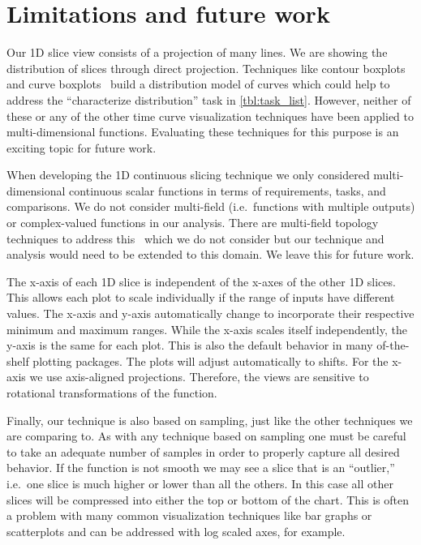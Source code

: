 \section{Limitations and future work}

Our 1D slice view consists of a projection of many lines. We are showing the
distribution of slices through direct projection. Techniques like contour
boxplots~\cite{Whitaker:2013} and curve boxplots~\cite{Mirzargar:2014} build a
distribution model of curves which could help to address the ``characterize
distribution'' task in \autoref{tbl:task_list}. However, neither of these or
any of the other time curve visualization techniques have been applied to
multi-dimensional functions. Evaluating these techniques for this purpose is an
exciting topic for future work.

When developing the 1D continuous slicing technique we only considered
multi-dimensional continuous scalar functions in terms of requirements, 
tasks, and comparisons. We do not consider multi-field 
(i.e.\ functions with multiple outputs) or complex-valued functions in our
analysis. There are multi-field topology techniques to address 
this~\cite{Duke:2012,Huettenberger:2014,Carr:2015} which we do not consider
but our technique and analysis would need to be extended to this domain.
We leave this for future work.

The x-axis of each 1D slice is independent of the x-axes of the other 1D
slices. This allows each plot to scale individually if the range of inputs have
different values.  The x-axis and y-axis automatically change to incorporate
their respective minimum and maximum ranges. While the x-axis scales itself
independently, the y-axis is the same for each plot.  This is also the default
behavior in many of-the-shelf plotting packages. The plots will adjust
automatically to shifts.  For the x-axis we use axis-aligned projections.
Therefore, the views are sensitive to rotational transformations of the
function. 

Finally, our technique is also based on sampling, just like the other
techniques we are comparing to. As with any technique based on sampling one
must be careful to take an adequate number of samples in order to properly
capture all desired behavior.
If the function is not smooth we may see a slice that is an ``outlier,'' i.e.\
one slice is much higher or lower than all the others. In this case all other
slices will be compressed into either the top or bottom of the chart. This is
often a problem with many common visualization techniques like bar graphs or
scatterplots and can be addressed with log scaled axes, for example.
